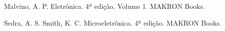 \begin{thebibliography}{3}

{\sc Malvino, A. P. Eletrônica. 4ª edição. Volume 1. MAKRON Books.}

{\sc Sedra, A. S. Smith, K. C. Microeletrônica. 4ª edição. MAKRON Books.}


\end{thebibliography}